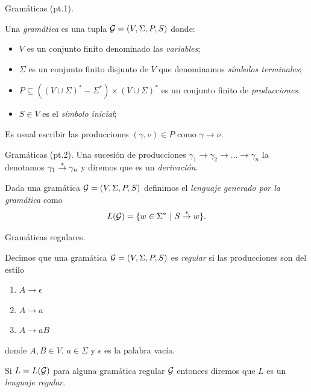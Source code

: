 \documentclass[aspectratio=169, 11pt]{beamer}
\begin{document}
	\begin{frame}[fragile]{Gramáticas (pt.1).}
		\begin{deff}
			Una \emph{gramática} es una tupla ${\cal G} = (V, \Sigma, P, S)$ donde:
				\begin{itemize}
					\item $V$ es un conjunto finito denominado las \emph{variables};
					\item $\Sigma$ es un conjunto finito disjunto de $V$ que denominamos \emph{símbolos terminales};
					\item $P \subseteq ((V \cup \Sigma)^{*} - \Sigma^{*}) \times (V \cup \Sigma)^*$ es un conjunto finito de \emph{producciones}.
					
					\item $S \in V$ es el \emph{símbolo inicial};
				\end{itemize}
				Es usual escribir las producciones $(\gamma, \nu) \in P$ como $\gamma \to \nu$. 
		\end{deff}
	\end{frame}
	
	\begin{frame}[fragile]{Gramáticas (pt.2).}
		Una sucesión de producciones $\gamma_{1} \to \gamma_{2} \to \dots \to \gamma_{n}$ la denotamos $\gamma_{1} \overset{*}{\to} \gamma_{n}$ y diremos que es un \emph{derivación}.



		\begin{deff}
			Dada una gramática ${\cal G} = (V, \Sigma, P, S)$  definimos el \emph{lenguaje generado por la gramática} como
			\[
			L({\cal G}) = \{ w \in \Sigma^* \ | \ S \overset{*}{\to} w   \}.
			\]
		\end{deff}		
	\end{frame}

	\begin{frame}{Gramáticas regulares.}
		\begin{deff}
			Decimos que una gramática ${\cal G} = (V, \Sigma, P, S)$ es \emph{regular} si las producciones son del estilo
	\begin{enumerate}
		\item $A \to \epsilon$
		\item $A \to a$
		\item $A \to a B$
	\end{enumerate}
	donde $A, B \in V$, $a \in \Sigma$ y $\epsilon$ es la palabra vacía. 

	Si $L=L({\cal G})$ para alguna gramática regular $\cal G$ entonces diremos que $L$ es un \emph{lenguaje regular}.
		\end{deff}
	\end{frame}
\end{document}
